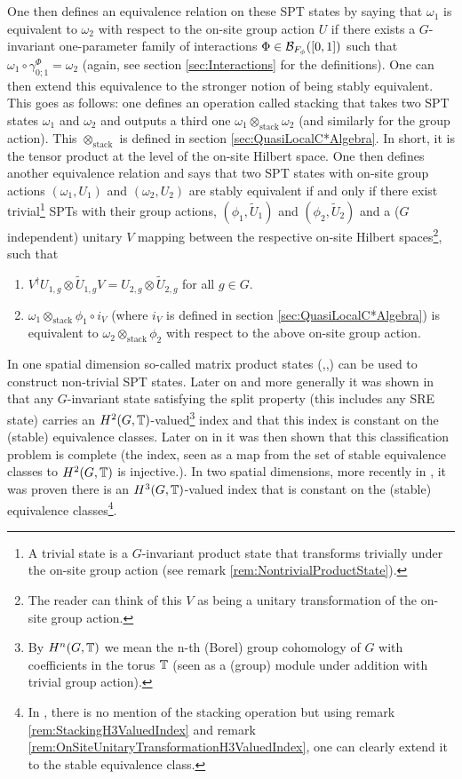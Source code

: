 \documentclass[11pt,a4paper,twoside]{article}
\numberwithin{equation}{section}
\begin{document}
	\\\\
	One then defines an equivalence relation on these SPT states by saying that $\omega_1$ is equivalent to $\omega_2$ with respect to the on-site group action $U$ if there exists a $G$-invariant one-parameter family of interactions $\Phi\in\mathcal B_{F_\phi}([0,1])$ such that $\omega_1\circ\gamma^\Phi_{0;1}=\omega_2$ (again, see section \ref{sec:Interactions} for the definitions). One can then extend this equivalence to the stronger notion of being stably equivalent. This goes as follows: one defines an operation called stacking that takes two SPT states $\omega_1$ and $\omega_2$ and outputs a third one $\omega_1\otimes_{\text{stack}}\omega_2$ (and similarly for the group action). This $\otimes_\text{stack}$ is defined in section \ref{sec:QuasiLocalC*Algebra}. In short, it is the tensor product at the level of the on-site Hilbert space. One then defines another equivalence relation and says that two SPT states with on-site group actions $(\omega_1,U_1)$ and $(\omega_2,U_2)$ are stably equivalent if and only if there exist trivial\footnote{A trivial state is a $G$-invariant product state that transforms trivially under the on-site group action (see remark \ref{rem:NontrivialProductState}).} SPTs with their group actions, $(\phi_1,\tilde{U}_1)$ and $(\phi_2,\tilde{U}_2)$ and a ($G$ independent) unitary $V$ mapping between the respective on-site Hilbert spaces\footnote{The reader can think of this $V$ as being a unitary transformation of the on-site group action.}, such that
	\begin{enumerate}
		\item $V^\dagger U_{1,g}\otimes \tilde{U}_{1,g}V=U_{2,g}\otimes \tilde{U}_{2,g}$ for all $g\in G$.
		\item $\omega_1\otimes_{\text{stack}}\phi_1\circ i_V$ (where $i_V$ is defined in section \ref{sec:QuasiLocalC*Algebra}) is equivalent to $\omega_2\otimes_{\text{stack}}\phi_2$ with respect to the above on-site group action.
	\end{enumerate}
	In one spatial dimension so-called matrix product states (\cite{Chen_2011},\cite{pollman2012symmetry},\cite{schuch2011MatrixProduct}) can be used to construct non-trivial SPT states. Later on and more generally it was shown in \cite{ogata2019classification} that any $G$-invariant state satisfying the split property (this includes any SRE state) carries an $H^2(G,\mathbb T)$-valued\footnote{By $H^n(G,\mathbb T)$ we mean the n-th (Borel) group cohomology of $G$ with coefficients in the torus $\mathbb T$ (seen as a (group) module under addition with trivial group action).} index and that this index is constant on the (stable) equivalence classes. Later on in \cite{kapustin2021classification} it was then shown that this classification problem is complete (the index, seen as a map from the set of stable equivalence classes to $H^2(G,\mathbb T)$ is injective.). In two spatial dimensions, more recently in \cite{ogata2021h3gmathbb}, it was proven there is an $H^3(G,\mathbb T)$-valued index that is constant on the (stable) equivalence classes\footnote{In \cite{ogata2021h3gmathbb}, there is no mention of the stacking operation but using remark \ref{rem:StackingH3ValuedIndex} and remark \ref{rem:OnSiteUnitaryTransformationH3ValuedIndex}, one can clearly extend it to the stable equivalence class.}.
\end{document}
